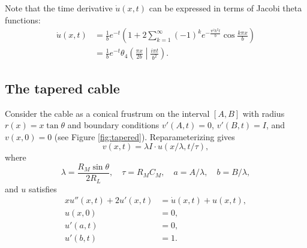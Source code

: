 \documentclass[parskip=half]{scrartcl}
\theoremstyle{nonumberplain}
\begin{document}
Note that the time derivative $\dot u(x,t)$ can be expressed in terms of Jacobi theta functions:
\begin{equation}
    \begin{aligned}
	\dot u(x,t) &= \frac{1}{b}e^{-t}\left(1+2\sum_{k=1}^{\infty} (-1)^ke^{-\frac{\pi^2 k^2 t}{b}}\cos\frac{k\pi x}{b}\right)\\
	&= \frac{1}{b}e^{-t}\theta_4\left(\frac{\pi x}{2 b}\middle| \frac{i\pi t}{b^2}\right).
    \end{aligned}
\end{equation}

\subsection{The tapered cable}

Consider the cable as a conical frustrum on the interval $[A, B]$ with radius
$r(x) = x \tan\theta$ and boundary conditions $v'(A, t) = 0$, $v'(B, t) = I$,
and $v(x, 0) = 0$ (see Figure \ref{fig:tapered}). Reparameterizing gives
\begin{equation}
    v(x, t) = \lambda I\cdot u(x/\lambda, t/\tau),
\end{equation}
where
\begin{equation}
    \lambda = \frac{R_M\sin\theta}{2 R_L}, \quad \tau = R_M C_M, \quad a = A/\lambda, \quad b = B/\lambda,
\end{equation}
and $u$ satisfies
\begin{equation}
    \begin{aligned}
	x u''(x, t) + 2 u'(x, t) &= \dot u(x, t) + u(x, t),\\
	u(x, 0) &= 0,\\
	u'(a, t) &= 0,\\
	u'(b, t) &= 1.
    \end{aligned}
\end{equation}
\end{document}
